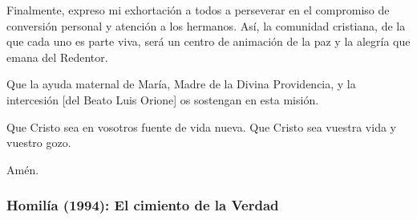 \begin{body}
[\ldots]

Finalmente, expreso mi exhortación a todos a perseverar en el compromiso de conversión personal y atención a los hermanos. Así, la comunidad cristiana, de la que cada uno es parte viva, será un centro de animación de la paz y la alegría que emana del Redentor.

Que la ayuda maternal de María, Madre de la Divina Providencia, y la intercesión [del Beato Luis Orione] os sostengan en esta misión.

Que Cristo sea en vosotros fuente de vida nueva. Que Cristo sea vuestra vida y vuestro gozo.

Amén.
\end{body}


\subsubsection{Homilía (1994): El cimiento de la Verdad}


